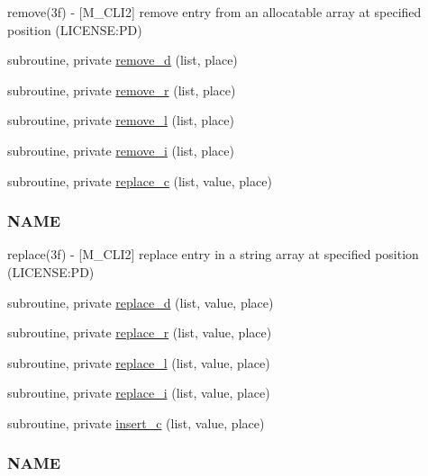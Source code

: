 \begin{DoxyCompactItemize}
\begin{DoxyCompactList}
remove(3f) -\/ \mbox{[}M\+\_\+\+C\+L\+I2\mbox{]} remove entry from an allocatable array at specified position (L\+I\+C\+E\+N\+SE\+:PD) \end{DoxyCompactList}\item 
subroutine, private \mbox{\hyperlink{namespacem__cli2_a5deb6a427a39e04c5a18a82497d5cf84}{remove\+\_\+d}} (list, place)
\item 
subroutine, private \mbox{\hyperlink{namespacem__cli2_a281edafaa6f74c30bd8de6d0c1d05be6}{remove\+\_\+r}} (list, place)
\item 
subroutine, private \mbox{\hyperlink{namespacem__cli2_ae3fc38d25a8a4892bde95a7198c2495a}{remove\+\_\+l}} (list, place)
\item 
subroutine, private \mbox{\hyperlink{namespacem__cli2_a1c2bd26b3c04a499cc65b00133dfe6b9}{remove\+\_\+i}} (list, place)
\item 
subroutine, private \mbox{\hyperlink{namespacem__cli2_affd644ac84d1010b40748f80d142d6b3}{replace\+\_\+c}} (list, value, place)
\begin{DoxyCompactList}\small\item\em \subsubsection*{N\+A\+ME}

replace(3f) -\/ \mbox{[}M\+\_\+\+C\+L\+I2\mbox{]} replace entry in a string array at specified position (L\+I\+C\+E\+N\+SE\+:PD) \end{DoxyCompactList}\item 
subroutine, private \mbox{\hyperlink{namespacem__cli2_ac327823dd714cd4c1667666158f0c135}{replace\+\_\+d}} (list, value, place)
\item 
subroutine, private \mbox{\hyperlink{namespacem__cli2_abe681a8b55ae238b029766713a79210a}{replace\+\_\+r}} (list, value, place)
\item 
subroutine, private \mbox{\hyperlink{namespacem__cli2_ae4a1802207f6b67e36cbf89003d6fb55}{replace\+\_\+l}} (list, value, place)
\item 
subroutine, private \mbox{\hyperlink{namespacem__cli2_a0a591fd55e8010f26eb6f9f6bafc1ddb}{replace\+\_\+i}} (list, value, place)
\item 
subroutine, private \mbox{\hyperlink{namespacem__cli2_ab3f2aa827b3b7ff419bcdc3ccb2672b3}{insert\+\_\+c}} (list, value, place)
\begin{DoxyCompactList}\small\item\em \subsubsection*{N\+A\+ME}


\end{DoxyCompactList}
\end{DoxyCompactItemize}
